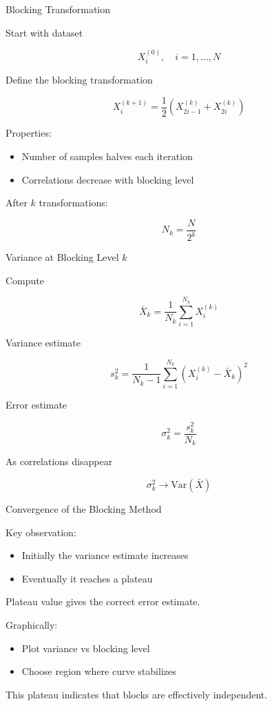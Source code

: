 \documentclass{beamer}
\begin{document}
\begin{frame}{Blocking Transformation}

  Start with dataset

  \[
  X^{(0)}_i, \quad i=1,\dots,N
  \]

  Define the blocking transformation

  \[
  X^{(k+1)}_i
  =
  \frac{1}{2}
  \left(
  X^{(k)}_{2i-1}
  +
  X^{(k)}_{2i}
  \right)
  \]

  Properties:

  \begin{itemize}
  \item Number of samples halves each iteration
  \item Correlations decrease with blocking level
  \end{itemize}

  After $k$ transformations:

  \[
  N_k = \frac{N}{2^k}
  \]
\end{frame}


\begin{frame}{Variance at Blocking Level $k$}

  Compute

  \[
  \bar X_k
  =
  \frac{1}{N_k}
  \sum_{i=1}^{N_k} X^{(k)}_i
  \]

  Variance estimate

  \[
  s_k^2
  =
  \frac{1}{N_k-1}
  \sum_{i=1}^{N_k}
  \left(
  X^{(k)}_i - \bar X_k
  \right)^2
  \]

  Error estimate

  \[
  \sigma_k^2
  =
  \frac{s_k^2}{N_k}
  \]

  As correlations disappear

  \[
  \sigma_k^2
  \rightarrow
  \mathrm{Var}(\bar X)
  \]
\end{frame}


\begin{frame}{Convergence of the Blocking Method}

  Key observation:

  \begin{itemize}
  \item Initially the variance estimate increases
  \item Eventually it reaches a plateau
  \end{itemize}

  Plateau value gives the correct error estimate.

  Graphically:

  \begin{itemize}
  \item Plot variance vs blocking level
  \item Choose region where curve stabilizes
  \end{itemize}

  This plateau indicates that blocks are effectively independent.
\end{frame}
\end{document}
